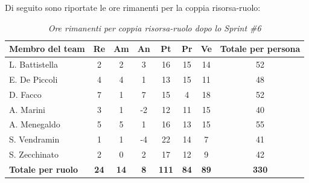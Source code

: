 ﻿\documentclass[a4paper, 10pt, colorlinks=true, linkcolor=black, urlcolor=blue, citecolor=blue, hidelinks]{article}
\renewcommand{\arraystretch}{1.2}
\begin{document}
Di seguito sono riportate le ore rimanenti per la coppia risorsa-ruolo:

\begin{table}[H]
    \centering
    \renewcommand{\arraystretch}{1.4}
    \begin{tabular}{|l|c|c|c|c|c|c|c|}
        \hline
        \rowcolor{bluBitless!15}
        \textbf{Membro del team} & \textbf{Re} & \textbf{Am} & \textbf{An} & \textbf{Pt} & \textbf{Pr} & \textbf{Ve} & \textbf{Totale per persona} \\
        \hline
        L. Battistella & 2 & 2 & 3 & 16 & 15 & 14 & 52 \\ \hline
        E. De Piccoli & 4 & 4 & 1 & 13 & 15 & 11 & 48 \\ \hline
        D. Facco & 7 & 1 & 7 & 15 & 4 & 18 & 52 \\ \hline
        A. Marini & 3 & 1 & -2 & 12 & 11 & 15 & 40 \\ \hline
        A. Menegaldo & 5 & 5 & 1 & 16 & 13 & 15 & 55 \\ \hline
        S. Vendramin & 1 & 1 & -4 & 22 & 14 & 7 & 41 \\ \hline
        S. Zecchinato & 2 & 0 & 2 & 17 & 12 & 9 & 42 \\ \hline
        \rowcolor{bluBitless!8}
        \textbf{Totale per ruolo} & \textbf{24} & \textbf{14} & \textbf{8} & \textbf{111} & \textbf{84} & \textbf{89} & \textbf{330} \\
        \hline
    \end{tabular}
    \caption{\textit{Ore rimanenti per coppia risorsa-ruolo dopo lo Sprint \#6}}
\end{table}
\end{document}
